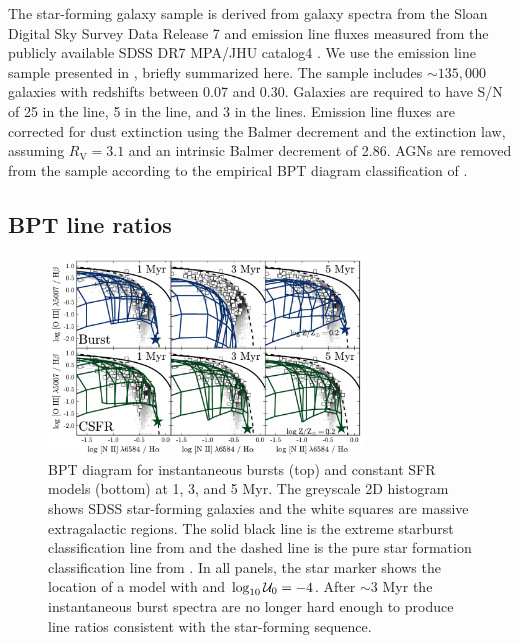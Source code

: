 The star-forming galaxy sample is derived from galaxy spectra from the Sloan Digital Sky Survey Data Release 7 \citep[SDSS DR7;][]{York00, Abazajian09} and emission line fluxes measured from the publicly available SDSS DR7 MPA/JHU catalog4 \citep{Kauffmann03a, Brinchmann04, Salim07}. We use the emission line sample presented in \citet{Telford16}, briefly summarized here. The sample includes $\sim 135,000$ galaxies with redshifts between 0.07 and 0.30. Galaxies are required to have S/N of 25 in the \ha{} line, 5 in the \hb{} line, and 3 in the \sii{} lines. Emission line fluxes are corrected for dust extinction using the Balmer decrement and the \citet{Cardelli89} extinction law, assuming $R_{\mathrm{V}} = 3.1$ and an intrinsic Balmer decrement of 2.86. AGNs are removed from the sample according to the empirical BPT diagram classification of \citet{Kauffmann03b}.

\subsection{BPT line ratios}\label{sec:models:diagnostics:BPT}
\begin{figure}[!htbp]
    \begin{centering}
        \includegraphics[width=0.75\textwidth]{manuscript/chapter2/f17.pdf}
        \caption{BPT diagram for instantaneous bursts (top) and constant SFR models (bottom) at 1, 3, and 5 Myr. The greyscale 2D histogram shows SDSS star-forming galaxies and the white squares are massive extragalactic \hii regions. The solid black line is the extreme starburst classification line from \citet{Kewley01} and the dashed line is the pure star formation classification line from \citet{Kauffmann03a}. In all panels, the star marker shows the location of a model with  and $\log_{10} \mathcal{U}_0=-4$. After $\sim3$ Myr the instantaneous burst spectra are no longer hard enough to produce line ratios consistent with the star-forming sequence.}
        \label{fig:BPTage}
    \end{centering}
\end{figure}

